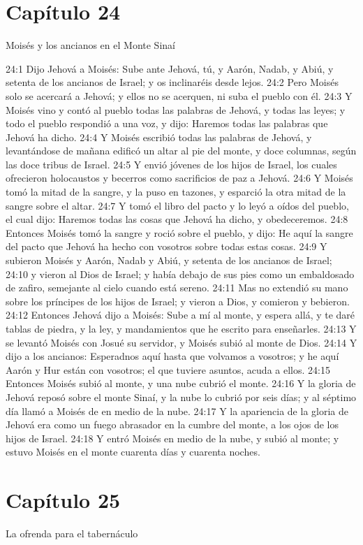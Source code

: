 \section*{Capítulo 24}
Moisés y los ancianos en el Monte Sinaí 

24:1 Dijo Jehová a Moisés: Sube ante Jehová, tú, y Aarón, Nadab, y Abiú, y setenta de los ancianos de Israel; y os inclinaréis desde lejos. 
24:2 Pero Moisés solo se acercará a Jehová; y ellos no se acerquen, ni suba el pueblo con él. 
24:3 Y Moisés vino y contó al pueblo todas las palabras de Jehová, y todas las leyes; y todo el pueblo respondió a una voz, y dijo: Haremos todas las palabras que Jehová ha dicho. 
24:4 Y Moisés escribió todas las palabras de Jehová, y levantándose de mañana edificó un altar al pie del monte, y doce columnas, según las doce tribus de Israel. 
24:5 Y envió jóvenes de los hijos de Israel, los cuales ofrecieron holocaustos y becerros como sacrificios de paz a Jehová. 
24:6 Y Moisés tomó la mitad de la sangre, y la puso en tazones, y esparció la otra mitad de la sangre sobre el altar. 
24:7 Y tomó el libro del pacto y lo leyó a oídos del pueblo, el cual dijo: Haremos todas las cosas que Jehová ha dicho, y obedeceremos. 
24:8 Entonces Moisés tomó la sangre y roció sobre el pueblo, y dijo: He aquí la sangre del pacto que Jehová ha hecho con vosotros sobre todas estas cosas. 
24:9 Y subieron Moisés y Aarón, Nadab y Abiú, y setenta de los ancianos de Israel; 
24:10 y vieron al Dios de Israel; y había debajo de sus pies como un embaldosado de zafiro, semejante al cielo cuando está sereno. 
24:11 Mas no extendió su mano sobre los príncipes de los hijos de Israel; y vieron a Dios, y comieron y bebieron. 
24:12 Entonces Jehová dijo a Moisés: Sube a mí al monte, y espera allá, y te daré tablas de piedra, y la ley, y mandamientos que he escrito para enseñarles. 
24:13 Y se levantó Moisés con Josué su servidor, y Moisés subió al monte de Dios. 
24:14 Y dijo a los ancianos: Esperadnos aquí hasta que volvamos a vosotros; y he aquí Aarón y Hur están con vosotros; el que tuviere asuntos, acuda a ellos. 
24:15 Entonces Moisés subió al monte, y una nube cubrió el monte. 
24:16 Y la gloria de Jehová reposó sobre el monte Sinaí, y la nube lo cubrió por seis días; y al séptimo día llamó a Moisés de en medio de la nube. 
24:17 Y la apariencia de la gloria de Jehová era como un fuego abrasador en la cumbre del monte, a los ojos de los hijos de Israel. 
24:18 Y entró Moisés en medio de la nube, y subió al monte; y estuvo Moisés en el monte cuarenta días y cuarenta noches. 
\section*{Capítulo 25}
La ofrenda para el tabernáculo 


